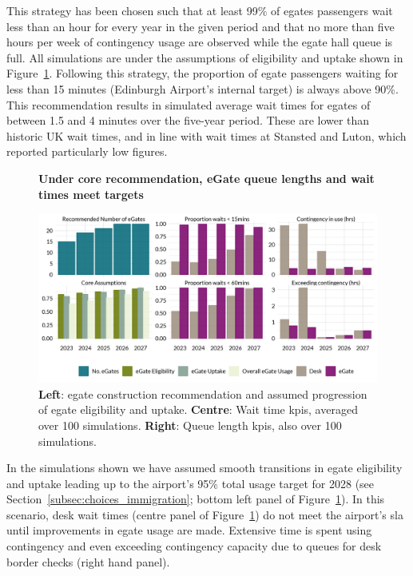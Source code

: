 \documentclass[10pt]{article}
\newcommand*{\figuretitle}[1]{%
    {\centering%
    \textbf{#1}%
    \par\medskip}%
}
\begin{document}
This strategy has been chosen such that at least 99\% of \glspl{egate} passengers wait less than an hour for every year in the given period and that no more than five hours per week of contingency usage are observed while the \gls{egate} hall queue is full. All simulations are under the assumptions of eligibility and uptake shown in Figure~\ref{fig:core_rec_fig}. Following this strategy, the proportion of \gls{egate} passengers waiting for less than 15 minutes (Edinburgh Airport's internal target) is always above 90\%. This recommendation results in simulated average wait times for \glspl{egate} of between 1.5 and 4 minutes over the five-year period. These are lower than historic UK wait times, and in line with wait times at Stansted and Luton, which reported particularly low figures. 

\begin{figure}[!ht]
    \centering
    \figuretitle{Under core recommendation, eGate queue lengths and wait times meet targets}
    \includegraphics[width=\textwidth]{figures/core_rec_fig.png}
     \caption{\textbf{Left}: \gls{egate} construction recommendation and assumed progression of \gls{egate} eligibility and uptake. \textbf{Centre}: Wait time \glspl{kpi}, averaged over 100 simulations. \textbf{Right}: Queue length \glspl{kpi}, also over 100 simulations.} \label{fig:core_rec_fig}
\end{figure}

In the simulations shown we have assumed smooth transitions in \gls{egate} eligibility and uptake leading up to the airport's 95\% total usage target for 2028 (see Section~\ref{subsec:choices_immigration}; bottom left panel of Figure~\ref{fig:core_rec_fig}). In this scenario, desk wait times (centre panel of Figure~\ref{fig:core_rec_fig}) do not meet the airport's \gls{sla} until improvements in \gls{egate} usage are made. Extensive time is spent using contingency and even exceeding contingency capacity due to queues for desk border checks (right hand panel). 
\end{document}
